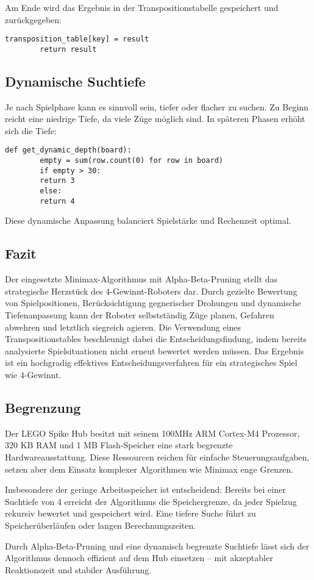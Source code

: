 	Am Ende wird das Ergebnis in der Transpositionstabelle gespeichert und zurückgegeben:
	
	\begin{lstlisting}[style=pythonstyle]
		transposition_table[key] = result
		return result
	\end{lstlisting}
	
	\subsection*{Dynamische Suchtiefe}
	
	Je nach Spielphase kann es sinnvoll sein, tiefer oder flacher zu suchen. Zu Beginn reicht eine niedrige Tiefe, da viele Züge möglich sind. In späteren Phasen erhöht sich die Tiefe:
	
	\begin{lstlisting}[style=pythonstyle]
		def get_dynamic_depth(board):
		empty = sum(row.count(0) for row in board)
		if empty > 30:
		return 3
		else:
		return 4
	\end{lstlisting}
	
	Diese dynamische Anpassung balanciert Spielstärke und Rechenzeit optimal.
	
	\subsection*{Fazit}
	
	Der eingesetzte Minimax-Algorithmus mit Alpha-Beta-Pruning stellt das strategische Herzstück des 4-Gewinnt-Roboters dar. Durch gezielte Bewertung von Spielpositionen, Berücksichtigung gegnerischer Drohungen und dynamische Tiefenanpassung kann der Roboter selbstständig Züge planen, Gefahren abwehren und letztlich siegreich agieren. Die Verwendung eines Transpositionstables beschleunigt dabei die Entscheidungsfindung, indem bereits analysierte Spielsituationen nicht erneut bewertet werden müssen. Das Ergebnis ist ein hochgradig effektives Entscheidungsverfahren für ein strategisches Spiel wie 4-Gewinnt.
	
	
	\subsection{Begrenzung}
	Der LEGO Spike Hub besitzt mit seinem 100MHz ARM Cortex-M4 Prozessor, 320 KB RAM und 1 MB Flash-Speicher eine stark begrenzte Hardwareausstattung. Diese Ressourcen reichen für einfache Steuerungsaufgaben, setzen aber dem Einsatz komplexer Algorithmen wie Minimax enge Grenzen.
	
	Insbesondere der geringe Arbeitsspeicher ist entscheidend: Bereits bei einer Suchtiefe von 4 erreicht der Algorithmus die Speichergrenze, da jeder Spielzug rekursiv bewertet und gespeichert wird. Eine tiefere Suche führt zu Speicherüberläufen oder langen Berechnungszeiten.
	
	Durch Alpha-Beta-Pruning und eine dynamisch begrenzte Suchtiefe lässt sich der Algorithmus dennoch effizient auf dem Hub einsetzen – mit akzeptabler Reaktionszeit und stabiler Ausführung.


	


